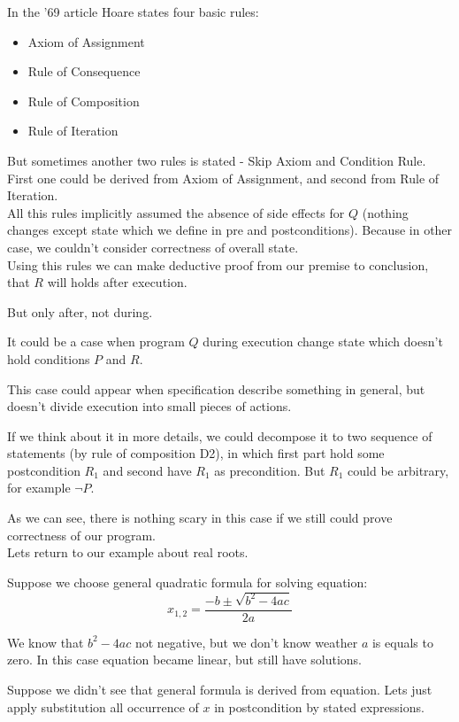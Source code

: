 \documentclass[twoside,twocolumn]{article}
\begin{document}
In the '69 article Hoare states four basic rules:
\begin{itemize}
\item
  Axiom of Assignment
\item
  Rule of Consequence
\item
  Rule of Composition
\item
  Rule of Iteration
\end{itemize}
But sometimes another two rules is stated - Skip Axiom and Condition Rule. First
one could be derived from Axiom of Assignment, and second from Rule of
Iteration.\\

All this rules implicitly assumed the absence of side effects for $Q$ (nothing
changes except state which we define in pre and postconditions). Because in
other case, we couldn't consider correctness of overall state. \\ 

Using this rules we can make deductive proof from our premise to conclusion,
that $R$ will holds after execution. 

But only after, not during.

It could be a case when program $Q$ during execution
change state which doesn't hold conditions $P$ and $R$.

This case could appear when specification describe something in general, but
doesn't divide execution into small pieces of actions.

If we think about it in more details, we could decompose it to two sequence of
statements (by rule of composition D2), in which first part hold some postcondition
$R_1$ and second have $R_1$ as precondition. But $R_1$ could be arbitrary, for example
$\neg P$.

As we can see, there is nothing scary in this case if we still could prove
correctness of our program. \\

Lets return to our example about real roots.

Suppose we choose general quadratic formula for solving equation:
$$ x_{1,2} = \frac{-b \pm \sqrt{b^2 - 4ac}}{2a}$$

We know that $b^2 - 4ac$ not negative, but we
don't know weather $a$ is equals to zero.
In this case equation became linear, but still have solutions. 

Suppose we didn't see that general formula is derived from equation. Lets just
apply substitution all occurrence of $x$ in postcondition by stated expressions.
\end{document}
